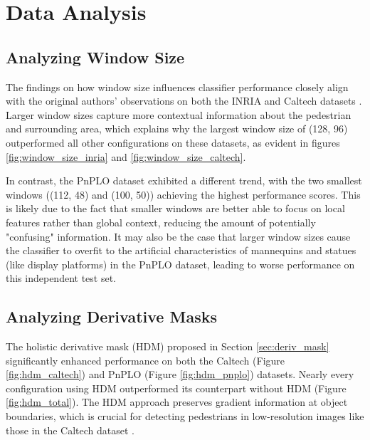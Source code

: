\section{Data Analysis}
\subsection{Analyzing Window Size}

The findings on how window size influences classifier performance closely align with the original authors' observations on both the INRIA and Caltech datasets \cite{dalal_2005_histograms}. Larger window sizes capture more contextual information about the pedestrian and surrounding area, which explains why the largest window size of (128, 96) outperformed all other configurations on these datasets, as evident in figures \ref{fig:window_size_inria} and \ref{fig:window_size_caltech}.

In contrast, the PnPLO dataset exhibited a different trend, with the two smallest windows ((112, 48) and (100, 50)) achieving the highest performance scores. This is likely due to the fact that smaller windows are better able to focus on local features rather than global context, reducing the amount of potentially "confusing" information. It may also be the case that larger window sizes cause the classifier to overfit to the artificial characteristics of mannequins and statues (like display platforms) in the PnPLO dataset, leading to worse performance on this independent test set.



\subsection{Analyzing Derivative Masks}

The holistic derivative mask (HDM) proposed in Section \ref{sec:deriv_mask} significantly enhanced performance on both the Caltech (Figure \ref{fig:hdm_caltech}) and PnPLO (Figure \ref{fig:hdm_pnplo}) datasets. Nearly every configuration using HDM outperformed its counterpart without HDM (Figure \ref{fig:hdm_total}). The HDM approach preserves gradient information at object boundaries, which is crucial for detecting pedestrians in low-resolution images like those in the Caltech dataset \cite{dollar_2009_pedestrian}.

